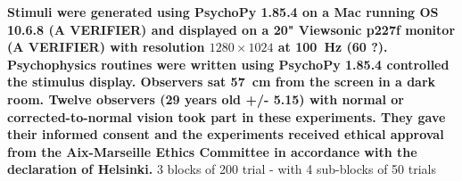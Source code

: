 \documentclass[profile,final,english,draft]{article}%
\begin{document}
\textbf{Stimuli were generated using PsychoPy 1.85.4 on a Mac running OS 10.6.8 (A VERIFIER) and displayed on a 20" Viewsonic p227f monitor (A VERIFIER) with resolution $1280\times 1024$ at 100~\si{\Hz} (60 ?). Psychophysics routines were written using PsychoPy 1.85.4 controlled the stimulus display. Observers sat 57~\si{\cm} from the screen in a dark room. Twelve observers (29 years old +/- 5.15) with normal or corrected-to-normal vision took part in these experiments. They gave their informed consent and the experiments received ethical approval from the Aix-Marseille Ethics Committee in accordance with the declaration of Helsinki.}
3 blocks of 200 trial - with 4 sub-blocks of 50 trials
\end{document}
